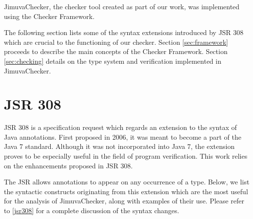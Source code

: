 \documentclass{pracamgr}
\theoremstyle{all}
\begin{document}
JimuvaChecker, the checker tool created as part of our work, was
implemented using the Checker Framework.

The following section lists some of the syntax extensions introduced
by JSR 308 which are crucial to the functioning of our checker.
Section \ref{sec:framework} proceeds to describe the main concepts of
the Checker Framework. Section \ref{sec:checking} details on the type
system and verification implemented in JimuvaChecker.

\section{JSR 308}
\label{sec:jsr308}

JSR 308 is a specification request which regards an extension to the
syntax of Java annotations. First proposed in 2006, it was meant to
become a part of the Java 7 standard. Although it was not incorporated
into Java 7, the extension proves to be especially useful in the field
of program verification. This work relies on the enhancements proposed
in JSR 308.

The JSR allows annotations to appear on any occurrence of a
type. Below, we list the syntactic constructs originating from this
extension which are the most useful for the analysis of JimuvaChecker,
along with examples of their use. Please refer to \ref{jsr308} for a
complete discussion of the syntax changes. 
\end{document}
